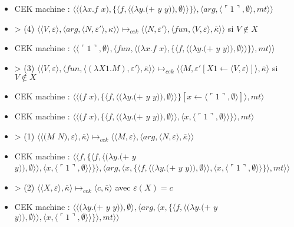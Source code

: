\documentclass[10pt,a4paper]{report}
\begin{document}
\begin{itemize}
\item[] CEK machine : $\langle\langle(\lambda x.f$ $x),\{\langle f,\langle(\lambda y.(+$ $y$ $y)),\emptyset\rangle\rangle\}\rangle,\langle arg,\langle\ulcorner 1\urcorner,\emptyset\rangle,mt\rangle\rangle$
\item[] > (4) $\langle \langle V,\varepsilon\rangle,\langle arg,\langle N,\varepsilon'\rangle,\kappa\rangle\rangle \longmapsto_{cek} \langle \langle N,\varepsilon'\rangle,\langle fun,\langle V,\varepsilon\rangle,\overline{\kappa}\rangle\rangle$ si $V \notin X$
\item[] CEK machine : $\langle\langle\ulcorner 1\urcorner,\emptyset\rangle,\langle fun,\langle(\lambda x.f$ $x),\{\langle f,\langle(\lambda y.(+$ $y$ $y)),\emptyset\rangle\rangle\}\rangle,mt\rangle\rangle$
\item[] > (3) $\langle\langle V,\varepsilon\rangle,\langle fun,\langle (\lambda X1.M),\varepsilon'\rangle,\overline{\kappa} \rangle \rangle \longmapsto_{cek} \langle \langle M,\varepsilon'[X1 \leftarrow \langle V,\varepsilon\rangle]\rangle,\overline{\kappa}\rangle$ si $V \notin X$
\item[] CEK machine : $\langle\langle(f$ $x),\{\langle f,\langle(\lambda y.(+$ $y$ $y)),\emptyset\rangle\rangle\}[x \leftarrow \langle\ulcorner 1\urcorner,\emptyset\rangle]\rangle,mt\rangle$
\item[] CEK machine : $\langle\langle(f$ $x),\{\langle f,\langle(\lambda y.(+$ $y$ $y)),\emptyset\rangle\rangle,\langle x,\langle\ulcorner 1\urcorner,\emptyset\rangle\rangle\}\rangle,mt\rangle$
\item[] > (1) $\langle\langle(M$ $N),\varepsilon\rangle,\overline{\kappa}\rangle \longmapsto_{cek} \langle \langle M,\varepsilon\rangle,\langle arg,\langle N,\varepsilon\rangle,\overline{\kappa}\rangle\rangle$
\item[] CEK machine : $\langle\langle f,\{\langle f,\langle(\lambda y.(+$ $y$ $y)),\emptyset\rangle\rangle,\langle x,\langle\ulcorner 1\urcorner,\emptyset\rangle\rangle\}\rangle,\langle arg,\langle x,\{\langle f,\langle(\lambda y.(+$ $y$ $y)),\emptyset\rangle\rangle,\langle x,\langle\ulcorner 1\urcorner,\emptyset\rangle\rangle\}\rangle,mt\rangle\rangle$
\item[] > (2) $\langle\langle X,\varepsilon\rangle,\overline{\kappa}\rangle \longmapsto_{cek} \langle c,\overline{\kappa}\rangle$ avec $\varepsilon(X) = c$
\item[] CEK machine : $\langle\langle(\lambda y.(+$ $y$ $y)),\emptyset\rangle,\langle arg,\langle x,\{\langle f,\langle(\lambda y.(+$ $y$ $y)),\emptyset\rangle\rangle,\langle x,\langle\ulcorner 1\urcorner,\emptyset\rangle\rangle\}\rangle,mt\rangle\rangle$

\end{itemize}
\end{document}
